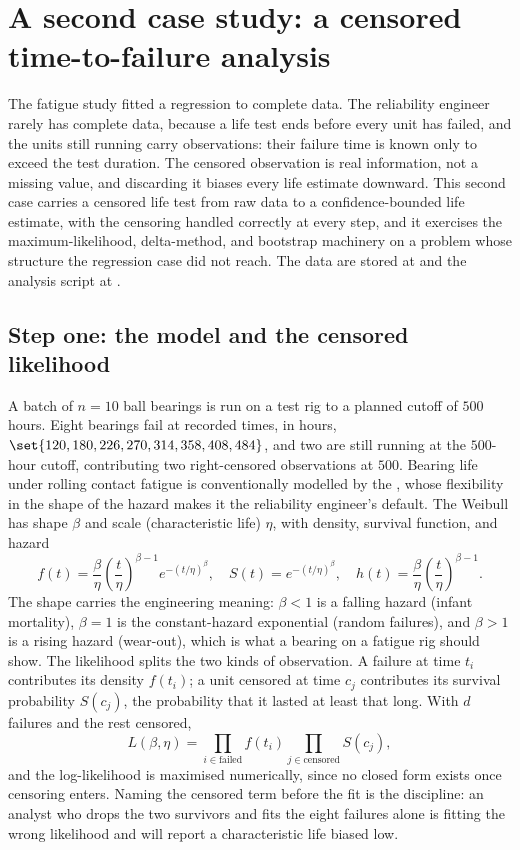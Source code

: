 \section{A second case study: a censored time-to-failure analysis}

The fatigue study fitted a regression to complete data. The
reliability engineer rarely has complete data, because a life test
ends before every unit has failed, and the units still running carry
 observations: their failure time is known
only to exceed the test duration. The censored observation is real
information, not a missing value, and discarding it biases every life
estimate downward. This second case carries a censored life test from
raw data to a confidence-bounded life estimate, with the censoring
handled correctly at every step, and it exercises the
maximum-likelihood, delta-method, and bootstrap machinery on a
problem whose structure the regression case did not reach. The data
are stored at
and the analysis script at
.

\subsection{Step one: the model and the censored likelihood}

A batch of $n = 10$ ball bearings is run on a test rig to a planned
cutoff of $500$ hours. Eight bearings fail at recorded times, in
hours, $\set{120, 180, 226, 270, 314, 358, 408, 484}$, and two are
still running at the $500$-hour cutoff, contributing two
right-censored observations at $500$. Bearing life under rolling
contact fatigue is conventionally modelled by the  \cite{paper:weibull1939}, whose flexibility in the
shape of the hazard makes it the reliability engineer's default. The
Weibull has shape $\beta$ and scale (characteristic life) $\eta$, with
density, survival function, and hazard
\[
f(t) = \frac{\beta}{\eta}\!\left(\frac{t}{\eta}\right)^{\beta-1}
e^{-(t/\eta)^{\beta}},
\quad
S(t) = e^{-(t/\eta)^{\beta}},
\quad
h(t) = \frac{\beta}{\eta}\!\left(\frac{t}{\eta}\right)^{\beta-1}.
\]
The shape carries the engineering meaning: $\beta < 1$ is a falling
hazard (infant mortality), $\beta = 1$ is the constant-hazard
exponential (random failures), and $\beta > 1$ is a rising hazard
(wear-out), which is what a bearing on a fatigue rig should show. The
likelihood splits the two kinds of observation. A failure at time
$t_{i}$ contributes its density $f(t_{i})$; a unit censored at time
$c_{j}$ contributes its survival probability $S(c_{j})$, the
probability that it lasted at least that long. With $d$ failures and
the rest censored,
\[
L(\beta, \eta) = \prod_{i \in \text{failed}} f(t_{i})
                 \prod_{j \in \text{censored}} S(c_{j}),
\]
and the log-likelihood is maximised numerically, since no closed form
exists once censoring enters. Naming the censored term before the fit
is the discipline: an analyst who drops the two survivors and fits the
eight failures alone is fitting the wrong likelihood and will report a
characteristic life biased low.

